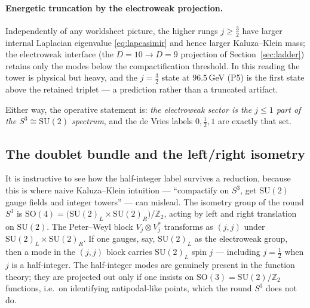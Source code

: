 \documentclass[11pt]{article}
\theoremstyle{plain}
\theoremstyle{definition}
\newcommand{\half}{\tfrac12}
\newcommand{\Z}{\mathbb{Z}}
\newcommand{\SU}{\mathrm{SU}}
\newcommand{\SO}{\mathrm{SO}}
\begin{document}
\paragraph{Energetic truncation by the electroweak projection.} Independently
of any worldsheet picture, the higher rungs $j\ge\tfrac32$ have larger
internal Laplacian eigenvalue \eqref{eq:lapcasimir} and hence larger
Kaluza--Klein mass; the electroweak interface (the $D=10\to D=9$ projection
of Section~\ref{sec:ladder}) retains only the modes below the
compactification threshold. In this reading the tower is physical but
heavy, and the $j=\tfrac32$ state at $96.5\,$GeV (P5) is the first state
above the retained triplet --- a prediction rather than a truncated artifact.

Either way, the operative statement is: \emph{the electroweak sector is the
$j\le1$ part of the $S^3\cong\SU(2)$ spectrum}, and the de Vries labels
$0,\half,1$ are exactly that set.

\subsection{The doublet bundle and the left/right isometry}
\label{sec:doublet}

It is instructive to see how the half-integer label survives a reduction,
because this is where naive Kaluza--Klein intuition --- ``compactify on
$S^3$, get $\SU(2)$ gauge fields and integer towers'' --- can mislead. The
isometry group of the round $S^3$ is $\SO(4)=\bigl(\SU(2)_L\times\SU(2)_R
\bigr)/\Z_2$, acting by left and right translation on $\SU(2)$. The
Peter--Weyl block $V_j\otimes V_j^*$ transforms as $(j,j)$ under
$\SU(2)_L\times\SU(2)_R$. If one gauges, say, $\SU(2)_L$ as the electroweak
group, then a mode in the $(j,j)$ block carries $\SU(2)_L$ spin $j$ ---
including $j=\half$ when $j$ is a half-integer. The half-integer modes are
genuinely present in the function theory; they are projected out only if one
insists on $\SO(3)=\SU(2)/\Z_2$ functions, i.e.\ on identifying
antipodal-like points, which the round $S^3$ does not do.
\end{document}
